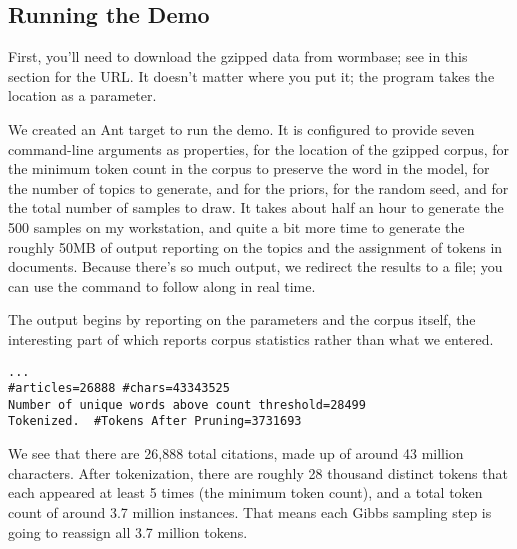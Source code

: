 \subsection{Running the Demo}

First, you'll need to download the gzipped data from wormbase; see
 in this section for the URL.  It
doesn't matter where you put it; the program takes the location as
a parameter.

We created an Ant target  to run the demo.  It is
configured to provide seven command-line arguments as properties,
 for the location of the gzipped corpus,
 for the minimum token count in the corpus to
preserve the word in the model,  for the number of
topics to generate,  and  for the
priors,  for the random seed, and 
for the total number of samples to draw.
%
%
It takes about half an hour to generate the 500 samples on my
workstation, and quite a bit more time to generate the roughly 50MB of
output reporting on the topics and the assignment of tokens in
documents.  Because there's so much output, we redirect the results to
a file; you can use the command  to follow along in real
time.

The output begins by reporting on the parameters and the corpus itself,
the interesting part of which reports corpus statistics rather than
what we entered.
%
\begin{verbatim}
...
#articles=26888 #chars=43343525
Number of unique words above count threshold=28499
Tokenized.  #Tokens After Pruning=3731693
\end{verbatim}
%
We see that there are 26,888 total citations, made up of around 43
million characters.  After tokenization, there are roughly 28 thousand
distinct tokens that each appeared at least 5 times (the minimum token
count), and a total token count of around 3.7 million instances.  That
means each Gibbs sampling step is going to reassign all 3.7 million
tokens.

